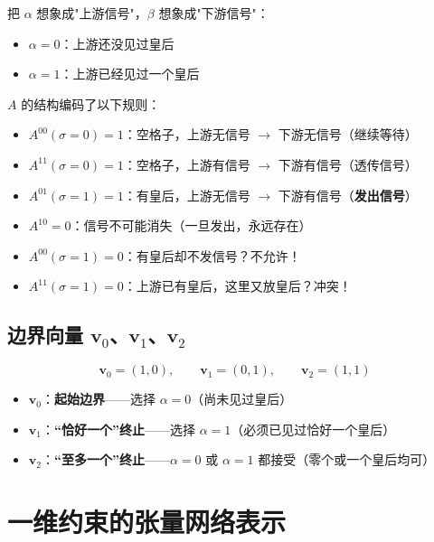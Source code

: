 \documentclass[12pt,a4paper]{article}
\begin{document}
\begin{exbox}[直觉理解]
把 $\alpha$ 想象成"上游信号"，$\beta$ 想象成"下游信号"：
\begin{itemize}
  \item $\alpha = 0$：上游还没见过皇后
  \item $\alpha = 1$：上游已经见过一个皇后
\end{itemize}
$A$ 的结构编码了以下规则：
\begin{itemize}
  \item $A^{00}(\sigma=0) = 1$：空格子，上游无信号 $\to$ 下游无信号（继续等待）
  \item $A^{11}(\sigma=0) = 1$：空格子，上游有信号 $\to$ 下游有信号（透传信号）
  \item $A^{01}(\sigma=1) = 1$：有皇后，上游无信号 $\to$ 下游有信号（\textbf{发出信号}）
  \item $A^{10} = 0$：信号不可能消失（一旦发出，永远存在）
  \item $A^{00}(\sigma=1) = 0$：有皇后却不发信号？不允许！
  \item $A^{11}(\sigma=1) = 0$：上游已有皇后，这里又放皇后？冲突！
\end{itemize}
\end{exbox}

\subsection{边界向量 $\mathbf{v}_0$、$\mathbf{v}_1$、$\mathbf{v}_2$}

\begin{keybox}[三个边界向量]
\[
\mathbf{v}_0 = (1, 0), \qquad \mathbf{v}_1 = (0, 1), \qquad \mathbf{v}_2 = (1, 1)
\]
\begin{itemize}
  \item $\mathbf{v}_0$：\textbf{起始边界}——选择 $\alpha = 0$（尚未见过皇后）
  \item $\mathbf{v}_1$：\textbf{``恰好一个''终止}——选择 $\alpha = 1$（必须已见过恰好一个皇后）
  \item $\mathbf{v}_2$：\textbf{``至多一个''终止}——$\alpha = 0$ 或 $\alpha = 1$ 都接受（零个或一个皇后均可）
\end{itemize}
\end{keybox}

\section{一维约束的张量网络表示}
\end{document}
